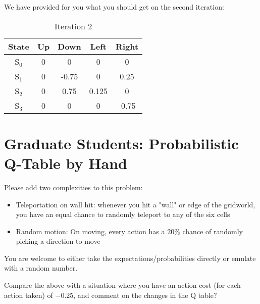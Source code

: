 \documentclass{exam}
\begin{document}
We have provided for you what you should get on the second iteration:  

\begin{table}[H] %
\centering
\begin{tabular}{c|c|c|c|c}
\textbf{State} & \textbf{Up} & \textbf{Down} & \textbf{Left} & \textbf{Right} \\
\hline
S$_0$ & 0      & 0     & 0     & 0 \\
S$_1$ & 0      & -0.75 & 0     & 0.25 \\
S$_2$ & 0      & 0.75  & 0.125 & 0 \\
S$_3$ & 0      & 0     & 0     & -0.75 \\
\end{tabular}
\caption{Iteration 2}
\end{table}

\section{Graduate Students: Probabilistic Q-Table by Hand}

Please add two complexities to this problem:

\begin{itemize}
    \item Teleportation on wall hit: whenever you hit a "wall" or edge of the gridworld, you have an equal chance to randomly teleport to any of the six cells
    \item Random motion: On moving, every action has a $20\%$ chance of randomly picking a direction to move
\end{itemize}

You are welcome to either take the expectations/probabilities directly or emulate with a random number.

Compare the above with a situation where you have an action cost (for each action taken) of $-0.25$, and comment on the changes in the Q table?
\end{document}
